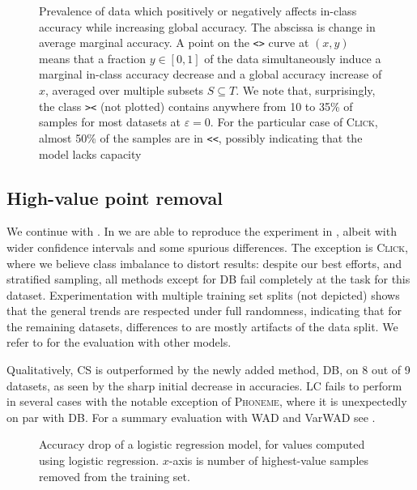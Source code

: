 \documentclass[10pt]{article}
\newcommand{\tmname}[1]{\textsc{#1}}
\newcommand{\tmtt}[1]{\texttt{#1}}
\begin{document}
\begin{figure}[h]
  \caption{\label{fig:dataset-characteristics}Prevalence of data which
  positively or negatively affects in-class accuracy while increasing global
  accuracy. The abscissa is change in average marginal accuracy. A point on
  the {\tmtt{<>}} curve at $(x, y)$ means that a fraction $y \in [0, 1]$ of
  the data simultaneously induce a marginal in-class accuracy decrease and a
  global accuracy increase of $x$, averaged over multiple subsets $S \subseteq
  T$. We note that, surprisingly, the class {\tmtt{><}} (not plotted) contains
  anywhere from 10 to 35\% of samples for most datasets at $\varepsilon = 0$.
  For the particular case of {\tmname{Click}}, almost 50\% of the samples are
  in {\tmtt{<<}}, possibly indicating that the model lacks capacity}
\end{figure}

\subsection{High-value point removal}\label{sec:high-value}

We continue with . In  we are
able to reproduce the experiment in {\cite{schoch_csshapley_2022}}, albeit
with wider confidence intervals and some spurious differences. The exception
is {\tmname{Click}}, where we believe class imbalance to distort results:
despite our best efforts, and stratified sampling, all methods except for DB
fail completely at the task for this dataset. Experimentation with multiple
training set splits (not depicted) shows that the general trends are respected
under full randomness, indicating that for the remaining datasets, differences
to {\cite{schoch_csshapley_2022}} are mostly artifacts of the data split. We
refer to  for the evaluation with other models.

Qualitatively, CS is outperformed by the newly added method, DB, on 8 out of 9
datasets, as seen by the sharp initial decrease in accuracies. LC fails to
perform in several cases with the notable exception of {\tmname{Phoneme}},
where it is unexpectedly on par with DB. For a summary evaluation with WAD and
VarWAD see .

\begin{figure}[h]
  \caption{\label{fig:acc-lr-lr}Accuracy drop of a logistic regression model,
  for values computed using logistic regression. $x$-axis is number of
  highest-value samples removed from the training set.}
\end{figure}
\end{document}

